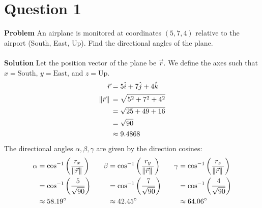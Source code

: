 \documentclass{article}
\begin{document}
\section{Question 1}
\label{question-1}
\textbf{Problem}
An airplane is monitored at coordinates $(5, 7, 4)$ relative to the airport
(South, East, Up). Find the directional angles of the plane.
\\
\\
\textbf{Solution}
Let the position vector of the plane be $\vec{r}$. We define the axes such that
$x=\text{South}$, $y=\text{East}$, and $z=\text{Up}$.
\begin{align*}
	\vec{r}         & = 5\hat{i} + 7\hat{j} + 4\hat{k} \\
	\norm*{\vec{r}} & = \sqrt{5^{2} + 7^{2} + 4^{2}}   \\
	                & = \sqrt{25 + 49 + 16}            \\
	                & = \sqrt{90}                      \\
	                & \approx 9.4868                   \\
\end{align*}
The directional angles $\alpha, \beta, \gamma$ are given by the direction
cosines:
\begin{alignat*}{3}
	\alpha & = \cos^{-1}\left(\frac{r_{x}}{\norm*{\vec{r}}}\right) \quad &
	\beta  & = \cos^{-1}\left(\frac{r_{y}}{\norm*{\vec{r}}}\right) \quad &
	\gamma & = \cos^{-1}\left(\frac{r_{z}}{\norm*{\vec{r}}}\right)         \\
	       & = \cos^{-1}\left(\frac{5}{\sqrt{90}}\right)                 &
	       & = \cos^{-1}\left(\frac{7}{\sqrt{90}}\right)                 &
	       & = \cos^{-1}\left(\frac{4}{\sqrt{90}}\right)                   \\
	       & \approx 58.19^\circ                                         &
	       & \approx 42.45^\circ                                         &
	       & \approx 64.06^\circ
\end{alignat*}
\pagebreak

\end{document}
